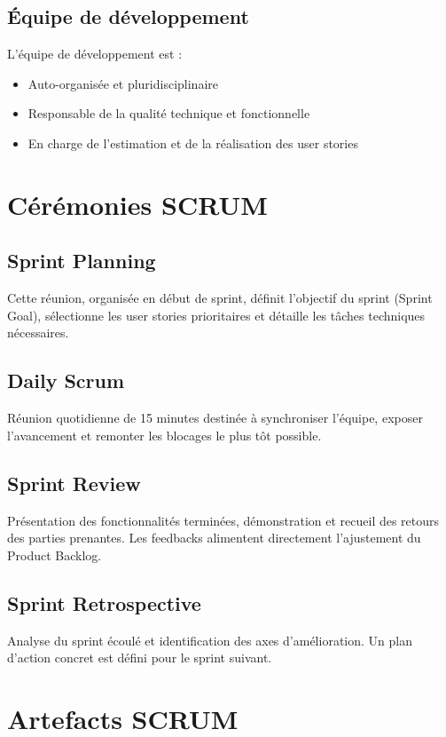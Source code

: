 \subsection{Équipe de développement}
L’équipe de développement est :
\begin{itemize}
    \item Auto-organisée et pluridisciplinaire
    \item Responsable de la qualité technique et fonctionnelle
    \item En charge de l’estimation et de la réalisation des user stories
\end{itemize}

\section{Cérémonies SCRUM}

\subsection{Sprint Planning}
Cette réunion, organisée en début de sprint, définit l’objectif du sprint (Sprint Goal), sélectionne les user stories prioritaires et détaille les tâches techniques nécessaires.

\subsection{Daily Scrum}
Réunion quotidienne de 15 minutes destinée à synchroniser l’équipe, exposer l’avancement et remonter les blocages le plus tôt possible.

\subsection{Sprint Review}
Présentation des fonctionnalités terminées, démonstration et recueil des retours des parties prenantes. Les feedbacks alimentent directement l’ajustement du Product Backlog.

\subsection{Sprint Retrospective}
Analyse du sprint écoulé et identification des axes d’amélioration. Un plan d’action concret est défini pour le sprint suivant.

\section{Artefacts SCRUM}

